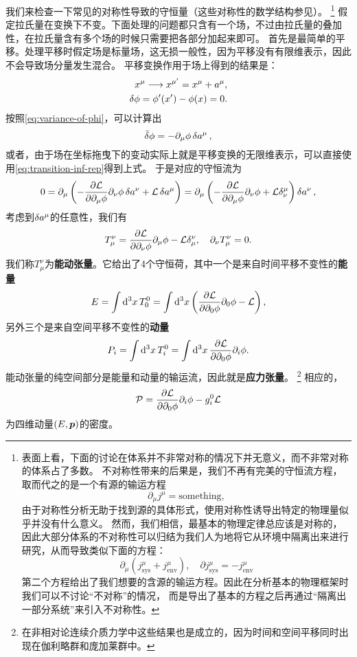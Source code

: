 \documentclass[hyperref, UTF8, a4paper]{ctexart}
\renewcommand{\autoref}{\prettyref}
\begin{document}
我们来检查一下常见的对称性导致的守恒量（这些对称性的数学结构参见\autoref{sec:symmetry}）。%
\footnote{表面上看，下面的讨论在体系并不非常对称的情况下并无意义，而不非常对称的体系占了多数。
不对称性带来的后果是，我们不再有完美的守恒流方程，取而代之的是一个有源的输运方程
\[
    \partial_\mu j^\mu = \text{something},
\]
由于对称性分析无助于找到源的具体形式，使用对称性诱导出特定的物理量似乎并没有什么意义。
然而，我们相信，最基本的物理定律总应该是对称的，因此大部分体系的不对称性可以归结为我们人为地将它从环境中隔离出来进行研究，从而导致类似下面的方程：
\[
    \partial_\mu (j^\mu_\text{sys} + j^\mu_\text{env}), \quad \partial j^\mu_\text{sys} = - j^\mu_\text{env}
\]
第二个方程给出了我们想要的含源的输运方程。因此在分析基本的物理框架时我们可以不讨论“不对称”的情况，
而是导出了基本的方程之后再通过“隔离出一部分系统”来引入不对称性。
}%
假定拉氏量在变换下不变。下面处理的问题都只含有一个场，不过由拉氏量的叠加性，在拉氏量含有多个场的时候只需要把各部分加起来即可。
首先是最简单的平移。处理平移时假定场是标量场，这无损一般性，因为平移没有有限维表示，因此不会导致场分量发生混合。
平移变换作用于场上得到的结果是：
\[
    \begin{split}
        x^\mu \longrightarrow x^{\mu'} = x^\mu + a^\mu, \\
        \var{\phi} = \phi'(x') - \phi(x) = 0.
    \end{split}
\]
按照\eqref{eq:variance-of-phi}，可以计算出
\[
    \bar{\var}{\phi} = - \partial_\mu \phi \var{a^\mu},
\]
或者，由于场在坐标拖曳下的变动实际上就是平移变换的无限维表示，可以直接使用\eqref{eq:transition-inf-rep}得到上式。
于是对应的守恒流为
\[
    0 = \partial_\mu \left( - \pdv{\mathcal{L}}{\partial_\mu \phi} \partial_\nu \phi \var{a^\nu} + \mathcal{L} \var{a^\mu} \right) 
    = \partial_\mu \left( - \pdv{\mathcal{L}}{\partial_\mu \phi} \partial_\nu \phi + \mathcal{L} \delta^\mu_\nu \right) \var{a^\nu},
\]
考虑到$\var{a^\mu}$的任意性，我们有
\begin{equation}
    T_\mu^\nu = \pdv{\mathcal{L}}{\partial_\nu \phi} \partial_\mu \phi - \mathcal{L} \delta^\nu_\mu, \quad \partial_\nu T_\mu^\nu = 0.
\end{equation}
我们称$T^\nu_\mu$为\textbf{能动张量}。它给出了4个守恒荷，其中一个是来自时间平移不变性的\textbf{能量}
\begin{equation}
    E = \int \dd[3]{x} T^0_0 = \int \dd[3]{x} \left( \pdv{\mathcal{L}}{\partial_0 \phi} \partial_0 \phi - \mathcal{L} \right) ,
    \label{eq:field-energy}
\end{equation}
另外三个是来自空间平移不变性的\textbf{动量}
\begin{equation}
    P_i = \int \dd[3]{x} T^0_i = \int \dd[3]{x} \pdv{\mathcal{L}}{\partial_0 \phi} \partial_i \phi .
    \label{eq:field-momentum}
\end{equation}
能动张量的纯空间部分是能量和动量的输运流，因此就是\textbf{应力张量}。%
\footnote{在非相对论连续介质力学中这些结果也是成立的，因为时间和空间平移同时出现在伽利略群和庞加莱群中。}
相应的，
\begin{equation}
    \mathcal{P} = \pdv{\mathcal{L}}{\partial_0 \phi} \partial_i \phi - g_i^0 \mathcal{L}
\end{equation}
为四维动量$(E, \vb*{p})$的密度。
\end{document}
